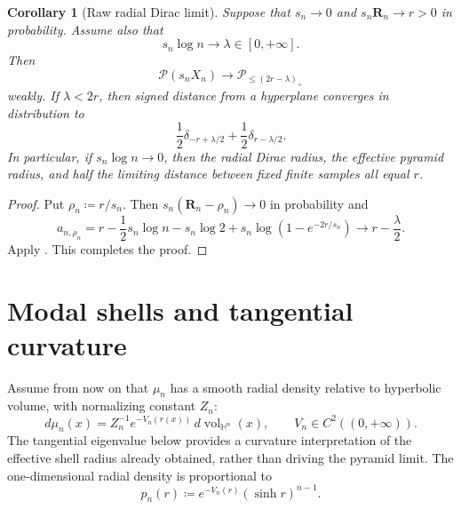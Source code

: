 \documentclass{amsart}
\numberwithin{equation}{section}
\theoremstyle{plain}
\newtheorem{cor}[thm]{Corollary}
\theoremstyle{definition}
\theoremstyle{remark}
\newcommand{\Hyp}{\mathbb{H}}
\newcommand{\Pyr}{\mathcal{P}}
\begin{document}
\begin{cor}[Raw radial Dirac limit]\label{cor:raw-dirac}
	Suppose that $s_n\to0$ and $s_n\mathbf R_n\to r>0$ in probability.  Assume also
	that
	\[
		s_n\log n\longrightarrow\lambda\in[0,+\infty].
	\]
	Then
	\begin{equation}\label{eq:raw-dirac-limit}
		\Pyr(s_nX_n)\longrightarrow
		\mathcal P_{\le(2r-\lambda)_+}
	\end{equation}
	weakly.  If $\lambda<2r$, then signed distance from a hyperplane
	converges in distribution to
\[ \frac12\delta_{-r+\lambda/2} +\frac12\delta_{r-\lambda/2}. \]
	In particular, if $s_n\log n\to0$, then the radial Dirac radius, the
	effective pyramid radius, and half the limiting distance between fixed
	finite samples all equal $r$.
\end{cor}

\begin{proof}
	Put $\rho_n\coloneqq r/s_n$.  Then
	$s_n(\mathbf R_n-\rho_n)\to0$ in probability and
	\[
		a_{n,\rho_n}
		=
		r-\frac12s_n\log n-s_n\log2
		+s_n\log(1-e^{-2r/s_n})
		\longrightarrow r-\frac\lambda2.
	\]
	Apply .  This completes the proof.
\end{proof}

\section{Modal shells and tangential curvature}
\label{sec:modal-curvature}

Assume from now on that $\mu_n$ has a smooth radial density relative to
hyperbolic volume, with normalizing constant $Z_n$:
\begin{equation}\label{eq:radial-gibbs}
	d\mu_n(x)
	=
	Z_n^{-1}e^{-V_n(r(x))}
	\,d\operatorname{vol}_{\Hyp^n}(x),
	\qquad
	V_n\in C^2((0,+\infty)).
\end{equation}
The tangential eigenvalue below provides a curvature interpretation of the
effective shell radius already obtained, rather than driving the pyramid
limit.
The one-dimensional radial density is proportional to
\begin{equation}\label{eq:radial-density} p_n(r)\coloneqq e^{-V_n(r)}(\sinh r)^{n-1}. \end{equation}
\end{document}
